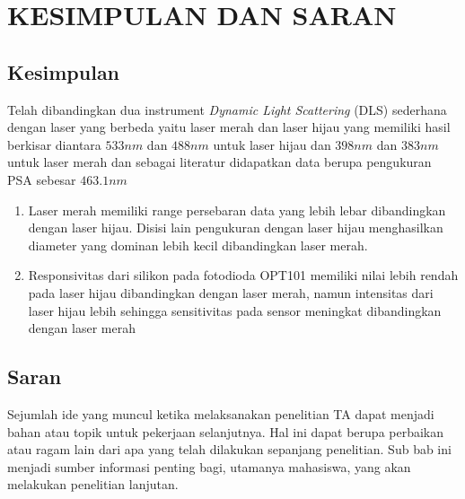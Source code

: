 \chapter{KESIMPULAN DAN SARAN}

\section{Kesimpulan}
Telah dibandingkan dua instrument \textit{Dynamic Light Scattering} (DLS) sederhana dengan
laser yang berbeda yaitu laser merah dan laser hijau yang memiliki hasil berkisar diantara
${533 nm}$ dan ${488 nm}$ untuk laser hijau dan ${398 nm}$ dan ${383 nm}$ untuk laser merah
dan sebagai literatur didapatkan data berupa pengukuran PSA sebesar ${463.1 nm}$
\begin{enumerate}
    \item Laser merah memiliki range persebaran data yang lebih lebar dibandingkan
    dengan laser hijau. Disisi lain pengukuran dengan laser hijau menghasilkan diameter yang
    dominan lebih kecil dibandingkan laser merah.
    \item Responsivitas dari silikon pada fotodioda OPT101 memiliki nilai lebih rendah
    pada laser hijau dibandingkan dengan laser merah, namun intensitas dari laser hijau lebih
    sehingga sensitivitas pada sensor meningkat dibandingkan dengan laser merah
\end{enumerate}


\section{Saran}
Sejumlah ide yang muncul ketika melaksanakan penelitian TA dapat menjadi bahan atau topik untuk pekerjaan selanjutnya. Hal ini dapat berupa perbaikan atau ragam lain dari apa yang telah dilakukan sepanjang penelitian. Sub bab ini menjadi sumber informasi penting bagi, utamanya mahasiswa, yang akan melakukan penelitian lanjutan.